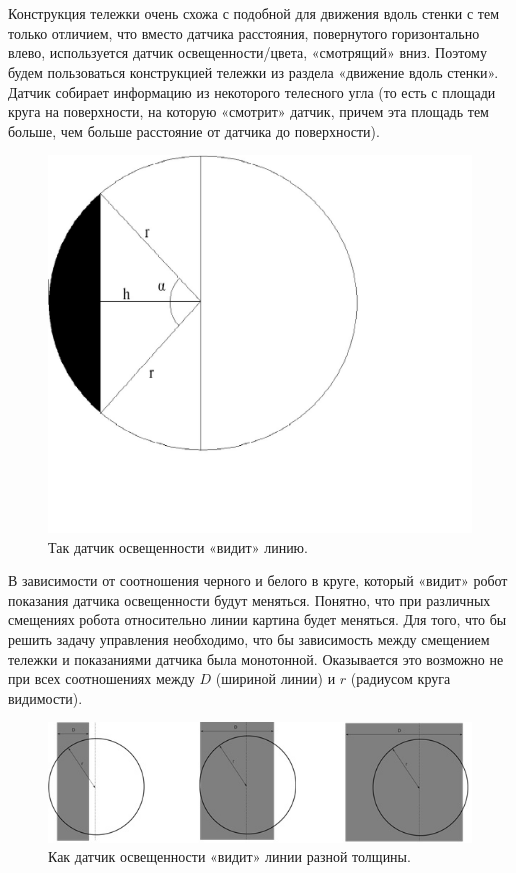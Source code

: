 {\hypertarget{lesson16x3}{}}\\\\	

Конструкция тележки очень схожа с подобной для движения вдоль стенки с тем только отличием, что вместо датчика расстояния, повернутого горизонтально влево, используется датчик освещенности/цвета, «смотрящий» вниз. Поэтому будем пользоваться конструкцией тележки из раздела «движение вдоль стенки». Датчик собирает информацию из некоторого телесного угла (то есть с площади круга на поверхности, на которую «смотрит» датчик, причем эта площадь тем больше, чем больше расстояние от датчика до поверхности).

\begin{figure}[h!]
	\begin{center}
		\includegraphics[width=0.5\linewidth]{chapters/chapter16/images/2}
		\caption{Так датчик освещенности «видит» линию.}
		\label{ris:image16x2}
	\end{center}
\end{figure}

В зависимости от соотношения черного и белого в круге, который «видит» робот показания датчика освещенности будут меняться. Понятно, что при различных смещениях робота относительно линии картина будет меняться. Для того, что бы решить задачу управления необходимо, что бы зависимость между смещением тележки и показаниями датчика была монотонной. Оказывается это возможно не при всех соотношениях между \(D\) (шириной линии) и \(r\) (радиусом круга видимости). 

\begin{figure}[h!]
	\begin{center}
		\includegraphics[width=0.79\linewidth]{chapters/chapter16/images/3}
		\caption{Как датчик освещенности «видит» линии разной толщины.}
		\label{ris:image16x3}
	\end{center}
\end{figure}

